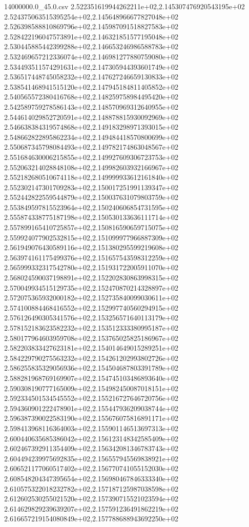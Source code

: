 \begin{filecontents*}{14000000.0_45.0.csv}
2.522351619944262211e+02,2.145307476920543195e+02
2.524375063515395254e+02,2.145648966677827048e+02
2.526398588810869796e+02,2.145987091518827583e+02
2.528422196047573891e+02,2.146321851577195048e+02
2.530445885442399288e+02,2.146653246986588783e+02
2.532469657212336074e+02,2.146981277880759080e+02
2.534493511574291631e+02,2.147305944393601749e+02
2.536517448745058232e+02,2.147627246659130833e+02
2.538541468941515120e+02,2.147945184811405852e+02
2.540565572380416768e+02,2.148259758984495420e+02
2.542589759278586143e+02,2.148570969312640955e+02
2.544614029852720591e+02,2.148878815930092969e+02
2.546638384319574868e+02,2.149183298971393015e+02
2.548662822895862234e+02,2.149484418570800699e+02
2.550687345798084493e+02,2.149782174863048567e+02
2.551684630006215855e+02,2.149927609306723753e+02
2.552063214028848108e+02,2.149982603932166967e+02
2.552182680510674118e+02,2.149999933612161840e+02
2.552302147301709283e+02,2.150017251991139347e+02
2.552442822559544879e+02,2.150037631079803759e+02
2.553849597815523964e+02,2.150240606854731595e+02
2.555874338775187198e+02,2.150530133636111714e+02
2.557899165410725857e+02,2.150816590659715075e+02
2.559924077902532815e+02,2.151099977966887309e+02
2.561949076430589116e+02,2.151380295599219608e+02
2.563974161175499376e+02,2.151657543598312259e+02
2.565999332317542780e+02,2.151931722005911070e+02
2.568024590037198891e+02,2.152202830863998315e+02
2.570049934515129735e+02,2.152470870214328897e+02
2.572075365932000182e+02,2.152735840099030611e+02
2.574100884468416552e+02,2.152997740560294915e+02
2.576126490305341576e+02,2.153256571640113179e+02
2.578152183623582232e+02,2.153512333380995187e+02
2.580177964603959708e+02,2.153765025825186967e+02
2.582203833427623181e+02,2.154014649015289251e+02
2.584229790275563232e+02,2.154261202993802726e+02
2.586255835329056936e+02,2.154504687803391789e+02
2.588281968769169907e+02,2.154745103486893640e+02
2.590308190777165009e+02,2.154982450087018151e+02
2.592334501534545552e+02,2.155216727646720756e+02
2.594360901222478901e+02,2.155447936209038744e+02
2.596387390022583190e+02,2.155676075816891171e+02
2.598413968116364003e+02,2.155901146513697313e+02
2.600440635685386042e+02,2.156123148342585409e+02
2.602467392911354409e+02,2.156342081346783743e+02
2.604494239975692835e+02,2.156557945569838921e+02
2.606521177060517402e+02,2.156770741055152030e+02
2.608548204347395654e+02,2.156980467846333340e+02
2.610575322018232782e+02,2.157187125987038598e+02
2.612602530255021520e+02,2.157390715521023594e+02
2.614629829239639207e+02,2.157591236491862219e+02
2.616657219154080849e+02,2.157788688943692250e+02

\end{filecontents*}
